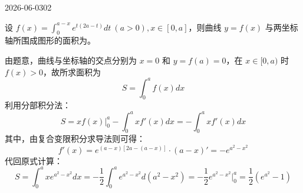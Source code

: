 \begin{mistake}{2026-06-03}{02}

\begin{problemcontent}
设 \(f(x) = \int_0^{a-x} e^{t(2a-t)} dt \ (a > 0), x \in [0, a]\)，则曲线 \(y = f(x)\) 与两坐标轴所围成图形的面积为\underline{\qquad\qquad}。
\end{problemcontent}

\begin{solutioncontent}
由题意，曲线与坐标轴的交点分别为 \(x=0\) 和 \(y=f(a)=0\)，在 \(x \in [0,a)\) 时 \(f(x)>0\)，故所求面积为
\[
S = \int_0^a f(x) dx
\]
利用分部积分法：
\[
S = x f(x) \Big|_0^a - \int_0^a x f'(x) dx = - \int_0^a x f'(x) dx
\]
其中，由复合变限积分求导法则可得：
\[
f'(x) = e^{(a-x)[2a-(a-x)]} \cdot (a-x)' = -e^{a^2-x^2}
\]
代回原式计算：
\[
S = \int_0^a x e^{a^2-x^2} dx = -\frac{1}{2} \int_0^a e^{a^2-x^2} d(a^2-x^2) = -\frac{1}{2} e^{a^2-x^2} \Big|_0^a = \frac{1}{2}(e^{a^2}-1)
\]
\end{solutioncontent}


\end{mistake}
